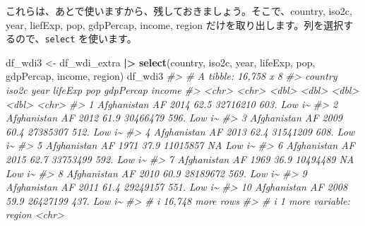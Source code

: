 \documentclass[
  xelatex, ja=standard]{bxjsbook}
\newenvironment{Shaded}{\begin{snugshade}}{\end{snugshade}}
\newcommand{\CommentTok}[1]{\textcolor[rgb]{0.56,0.35,0.01}{\textit{#1}}}
\newcommand{\FunctionTok}[1]{\textcolor[rgb]{0.13,0.29,0.53}{\textbf{#1}}}
\newcommand{\NormalTok}[1]{#1}
\newcommand{\OtherTok}[1]{\textcolor[rgb]{0.56,0.35,0.01}{#1}}
\newcommand{\SpecialCharTok}[1]{\textcolor[rgb]{0.81,0.36,0.00}{\textbf{#1}}}
\theoremstyle{definition}
\theoremstyle{definition}
\theoremstyle{definition}
\theoremstyle{definition}
\theoremstyle{remark}
\begin{document}
\begin{Shaded}
\end{Shaded}

これらは、あとで使いますから、残しておきましょう。そこで、country, iso2c, year, liefExp, pop, gdpPercap, income, region だけを取り出します。列を選択するので、\texttt{select} を使います。

\begin{Shaded}
\begin{Highlighting}[]
\NormalTok{df\_wdi3 }\OtherTok{\textless{}{-}}\NormalTok{ df\_wdi\_extra }\SpecialCharTok{|\textgreater{}} \FunctionTok{select}\NormalTok{(country, iso2c, year, lifeExp, pop, gdpPercap, income, region)}
\NormalTok{df\_wdi3}
\CommentTok{\#\textgreater{} \# A tibble: 16,758 x 8}
\CommentTok{\#\textgreater{}    country     iso2c  year lifeExp      pop gdpPercap income}
\CommentTok{\#\textgreater{}    \textless{}chr\textgreater{}       \textless{}chr\textgreater{} \textless{}dbl\textgreater{}   \textless{}dbl\textgreater{}    \textless{}dbl\textgreater{}     \textless{}dbl\textgreater{} \textless{}chr\textgreater{} }
\CommentTok{\#\textgreater{}  1 Afghanistan AF     2014    62.5 32716210      603. Low i\textasciitilde{}}
\CommentTok{\#\textgreater{}  2 Afghanistan AF     2012    61.9 30466479      596. Low i\textasciitilde{}}
\CommentTok{\#\textgreater{}  3 Afghanistan AF     2009    60.4 27385307      512. Low i\textasciitilde{}}
\CommentTok{\#\textgreater{}  4 Afghanistan AF     2013    62.4 31541209      608. Low i\textasciitilde{}}
\CommentTok{\#\textgreater{}  5 Afghanistan AF     1971    37.9 11015857       NA  Low i\textasciitilde{}}
\CommentTok{\#\textgreater{}  6 Afghanistan AF     2015    62.7 33753499      592. Low i\textasciitilde{}}
\CommentTok{\#\textgreater{}  7 Afghanistan AF     1969    36.9 10494489       NA  Low i\textasciitilde{}}
\CommentTok{\#\textgreater{}  8 Afghanistan AF     2010    60.9 28189672      569. Low i\textasciitilde{}}
\CommentTok{\#\textgreater{}  9 Afghanistan AF     2011    61.4 29249157      551. Low i\textasciitilde{}}
\CommentTok{\#\textgreater{} 10 Afghanistan AF     2008    59.9 26427199      437. Low i\textasciitilde{}}
\CommentTok{\#\textgreater{} \# i 16,748 more rows}
\CommentTok{\#\textgreater{} \# i 1 more variable: region \textless{}chr\textgreater{}}
\end{Highlighting}
\end{Shaded}
\end{document}
